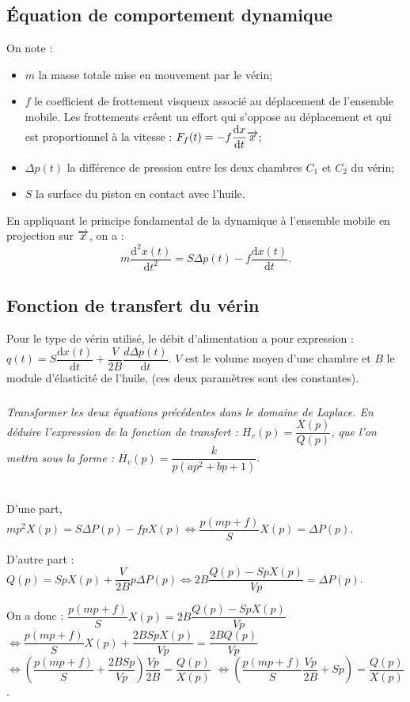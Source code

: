 \documentclass[10pt,fleqn]{article} %
\begin{document}
\begin{multicols}{2}
\subsection*{Équation de comportement dynamique}
On note : 
\begin{itemize}
\item $m$ la masse totale mise en mouvement par le vérin;
\item $f$ le coefficient de frottement visqueux associé au déplacement de l’ensemble mobile. Les frottements créent un effort qui s’oppose au déplacement et qui est proportionnel à la vitesse : $F_f(t)=-f\dfrac{\text{d} x}{\text{d} t} \overrightarrow{x}$;
\item $\Delta p(t)$ la différence de pression entre les deux chambres $C_1$ et $C_2$ du vérin;
\item $S$ la surface du piston en contact avec l’huile.
\end{itemize}
En appliquant le principe fondamental de la dynamique à l’ensemble mobile en projection sur $\overrightarrow{x}$, on a : 
$$m\dfrac{\text{d}^2 x(t) }{\text{d}t^2}=S\Delta p(t)-f\dfrac{\text{d} x(t) }{\text{d}t}.$$



\subsection*{Fonction de transfert du vérin}
Pour le type de vérin utilisé, le débit d'alimentation a pour expression : $q(t)=S\dfrac{\text{d}x(t)}{\text{d} t}+\dfrac{V}{2B}\dfrac{d\Delta p(t)}{\text{d}t}$. $V$ est le volume moyen d’une chambre et $B$ le module d’élasticité de l’huile, (ces deux paramètres sont des constantes).

\subparagraph{}\textit{Transformer les deux équations précédentes dans le domaine de Laplace. En déduire l’expression de la fonction de transfert : $H_v(p)=\dfrac{X(p)}{Q(p)}$, que l’on mettra sous la forme : $H_v(p)=\dfrac{k}{p\left( ap^2 + bp + 1\right)}$}.
\begin{corrige} ~\\
D'une part, $mp^2X(p)=S\Delta P(p)-fpX(p) \Leftrightarrow \dfrac{p\left(mp+f\right)}{S}X(p)=\Delta P(p) $.

D'autre part :
$Q(p)=SpX(p)+\dfrac{V}{2B}p\Delta P(p) \Leftrightarrow 2B\dfrac{Q(p)-SpX(p)}{Vp}=\Delta P(p) $.

On a donc : 
$\dfrac{p\left(mp+f\right)}{S}X(p) =
2B\dfrac{Q(p)-SpX(p)}{Vp}$
$\Longleftrightarrow
\dfrac{p\left(mp+f\right)}{S}X(p) +\dfrac{2BSpX(p)}{Vp}=
\dfrac{2BQ(p)}{Vp}$
$\Longleftrightarrow
\left(\dfrac{p\left(mp+f\right)}{S} +\dfrac{2BSp}{Vp}\right) \dfrac{Vp}{2B}=
\dfrac{Q(p)}{ X(p)}$
$\Longleftrightarrow
\left(\dfrac{p\left(mp+f\right)}{S} \dfrac{Vp}{2B}+Sp \right) =
\dfrac{Q(p)}{ X(p)}$.


\end{corrige}
\end{multicols}
\end{document}
